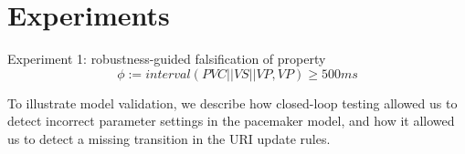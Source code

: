 \section{Experiments}
\label{experiments}
Experiment 1: robustness-guided falsification of property
\[\phi := interval(PVC || VS ||VP, VP) \geq 500ms \]

To illustrate model validation, we describe how closed-loop testing allowed us to detect incorrect parameter settings in the pacemaker model, and how it allowed us to detect a missing transition in the URI update rules.